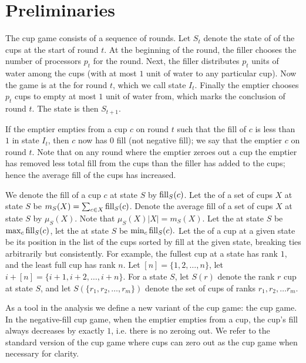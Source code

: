 \section{Preliminaries}\label{sec:prelims}
The cup game consists of a sequence of rounds. Let $S_t$ denote the state of of the cups at the start of round $t$. At the beginning of the round, the filler chooses the number
of processors $p_t$ for the round. Next, the filler distributes
$p_t$ units of water among the cups (with at most $1$ unit of
water to any particular cup). Now the game is at the
 for round $t$, which we call state $I_t$.
Finally the emptier chooses $p_t$ cups to empty at most $1$ unit
of water from, which marks the conclusion of round $t$. The state
is then $S_{t+1}$.

If the emptier empties from a cup $c$ on round $t$ such that the fill
of $c$ is less than $1$ in state $I_t$, then $c$ now has $0$ fill (not
negative fill); we say that the emptier  $c$ on round
$t$. Note that on any round where the emptier zeroes out a cup the
emptier has removed less total fill from the cups than the filler has
added to the cups; hence the average fill of the cups has increased.

We denote the fill of a cup $c$ at state $S$ by $\operatorname{\text{\textup{fill}}}_S(c)$. Let
the  of a set of cups $X$ at state $S$ be $m_S(X) =
\sum_{c\in X} \operatorname{\text{\textup{fill}}}_S(c)$. Denote the average fill of a set of
cups $X$ at state $S$ by $\mu_S(X)$. Note that $\mu_S(X) |X| =
m_S(X)$. Let the  at state $S$ be $\max_c
\operatorname{\text{\textup{fill}}}_S(c)$, let the  at state $S$ be $\min_c
\operatorname{\text{\textup{fill}}}_S(c).$
Let the  of a cup at a given state be its position in
the list of the cups sorted by fill at the given state, breaking
ties arbitrarily but consistently. For example, the fullest cup
at a state has rank $1$, and the least full cup has rank $n$. Let
$[n] = \{1,2,\ldots, n\}$, let $i+[n] = \{i+1, i+2, \ldots,
i+n\}$. For a state $S$, let $S(r)$ denote the rank $r$ cup at
state $S$, and let $S(\{r_1,r_2,\ldots, r_m\})$ denote the set of
cups of ranks $r_1, r_2,\ldots r_m$.

As a tool in the analysis we define a new variant of the cup
game: the  cup game. In the negative-fill cup
game, when the emptier empties from a cup, the cup's fill always
decreases by exactly $1$, i.e. there is no zeroing out. We refer
to the standard version of the cup game where cups can zero out
as the  cup game when necessary for clarity.


